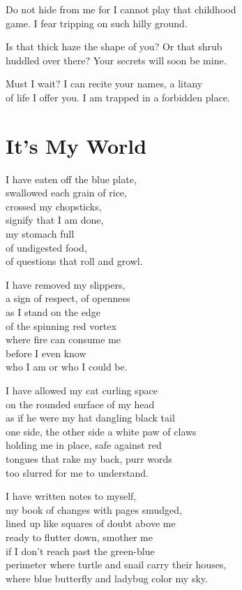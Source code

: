 \documentclass[twoside,10pt]{book}
\begin{document}
Do not hide from me for I cannot play that childhood\\
game. I fear tripping on such hilly ground.

Is that thick haze the shape of you? Or that shrub\\
huddled over there? Your secrets will soon be mine.

Must I wait? I can recite your names, a litany\\
of life I offer you. I am trapped in a forbidden place.


\clearpage
\section{It's My World}

I have eaten off the blue plate,\\
swallowed each grain of rice,\\
crossed my chopsticks,\\
signify that I am done,\\
my stomach full\\
of undigested food,\\
of questions that roll and growl.

I have removed my slippers,\\
a sign of respect, of openness\\
as I stand on the edge\\
of the spinning red vortex\\
where fire can consume me\\
before I even know\\
who I am or who I could be.

I have allowed my cat curling space\\
on the rounded surface of my head\\
as if he were my hat dangling black tail\\
one side, the other side a white paw of claws\\
holding me in place, safe against red\\
tongues that rake my back, purr words\\
too slurred for me to understand.

I have written notes to myself,\\
my book of changes with pages smudged,\\
lined up like squares of doubt above me\\
ready to flutter down, smother me\\
if I don't reach past the green-blue\\
perimeter where turtle and snail carry their houses,\\
where blue butterfly and ladybug color my sky.
\end{document}
